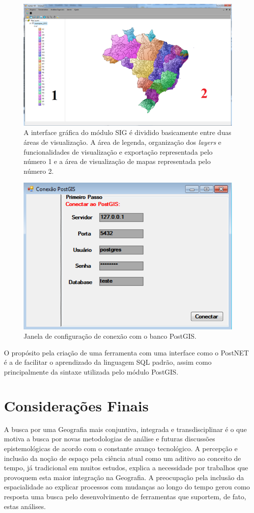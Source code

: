 	\begin{figure}
		\centering
		\includegraphics[width=1\linewidth]{data/sig_gui}
		\caption{A interface gráfica do módulo SIG é dividido basicamente entre duas áreas de visualização. A área de legenda, organização dos \textit{layers} e funcionalidades de visualização e exportação representada pelo número 1 e a área de visualização de mapas representada pelo número 2.}
		\label{fig:siggui}
	\end{figure}
	
	\begin{figure}
		\centering
		\includegraphics[width=0.7\linewidth]{data/postgis_config}
		\caption{Janela de configuração de conexão com o banco PostGIS.}
		\label{fig:postgisconfig}
	\end{figure}
	
O propósito pela criação de uma ferramenta com uma interface como o PostNET é a de facilitar o aprendizado da linguagem SQL padrão, assim como principalmente da sintaxe utilizada pelo módulo PostGIS.

\chapter{Considerações Finais}
A busca por uma Geografia mais conjuntiva, integrada e transdisciplinar é o que motiva a busca por novas metodologias de análise e futuras discussões epistemológicas de acordo com o constante avanço tecnológico. A percepção e inclusão da noção de espaço pela ciência atual como um aditivo ao conceito de tempo, já tradicional em muitos estudos, explica a necessidade por trabalhos que provoquem esta maior integração na Geografia. A preocupação pela inclusão da espacialidade ao explicar processos com mudanças ao longo do tempo gerou como resposta uma busca pelo desenvolvimento de ferramentas que suportem, de fato, estas análises. 

